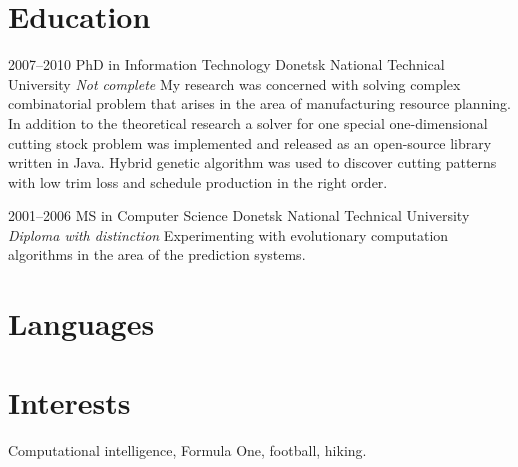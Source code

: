 \medskip
\section{Education}

\cventry
    {2007--2010}
    {PhD in Information Technology}
    {Donetsk National Technical University}
    {}
    {\newline\textit{Not complete}}
    {My research was concerned with solving complex combinatorial problem that
    arises in the area of manufacturing resource planning. In addition to the
    theoretical research a solver for one special one-dimensional cutting stock
    problem was implemented and released as an open-source library written in
    Java. Hybrid genetic algorithm was used to discover cutting patterns with
    low trim loss and schedule production in the right order.\newline}
    
\cventry
    {2001--2006}
    {MS in Computer Science}
    {Donetsk National Technical University}
    {}
    {\newline\textit{Diploma with distinction}}
    {Experimenting with evolutionary computation algorithms in the area of the
    prediction systems.}


\medskip
\nocite{*}
\renewcommand{\bibliographyitemlabel}{[\arabic{enumiv}]}

\begin{flushleft}

\end{flushleft}


\medskip
\section{Languages}


\medskip
\section{Interests}

\cvline
    {}{Computational intelligence, Formula One, football, hiking.}

\setcounter{footnote}{1}
\vfill
\enlargethispage{\footskip}
\footnotetext{\textcolor{color2}{Opening quote belongs to Chet Haase.}}

